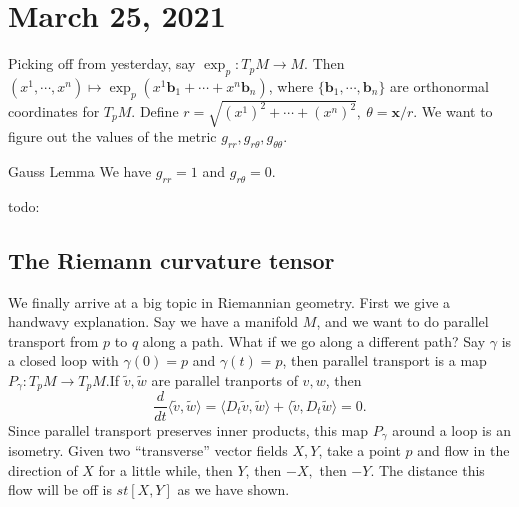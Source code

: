 \section{March 25, 2021} 
Picking off from yesterday, say $\exp_p \colon T_p M \to M$. Then $(x^1,\cdots ,x^n )\mapsto \exp_p(x^1 \mathbf b_1+\cdots +x^n \mathbf b_n )$, where $\{\mathbf b_1,\cdots ,\mathbf b_n \} $ are orthonormal coordinates for $T_p M$. Define $r=\sqrt{(x^1)^2+\cdots +(x^n )^2} ,\ \theta= \mathbf x / r.$ We want to figure out the values of the metric $g_{rr},g_{r\theta}, g_{\theta\theta}$.

\begin{namedthm}{Gauss Lemma} 
   We have $g_{rr}=1$ and $g_{r\theta}=0$. 
\end{namedthm}
{\color{red}todo:} 
\subsection{The Riemann curvature tensor}
We finally arrive at a big topic in Riemannian geometry. First we give a handwavy explanation. Say we have a manifold $M$, and we want to do parallel transport from $p$ to $q$ along a path. What if we go along a different path? Say $\gamma $ is a closed loop with $\gamma (0)=p$ and $\gamma (t)=p$, then parallel transport is a map $P_{\gamma }\colon T_p M \to T_p M$.If $\widetilde v,\widetilde w$ are parallel tranports of $v,w$, then \[
\frac{d}{dt}\langle \widetilde v,\widetilde w \rangle =\langle D_t \widetilde v,\widetilde w \rangle +\langle \widetilde v,D_t \widetilde w \rangle=0.
\] Since parallel transport preserves inner products, this map $P_{\gamma }$ around a loop is an isometry. Given two ``transverse'' vector fields $X,Y$, take a point $p$ and flow in the direction of $X$ for a little while, then $Y$, then $-X,$ then $-Y$. The distance this flow will be off is $st[X,Y]$ as we have shown.

